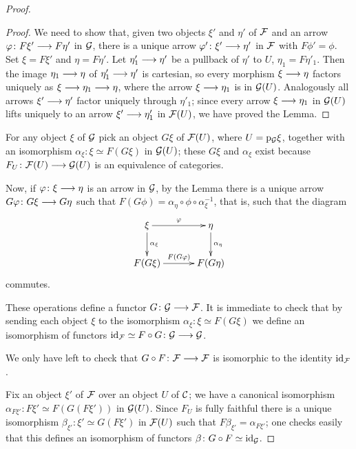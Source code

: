 \begin{3   FIBERED CATEGORIES}
\begin{3.5 Equivalences of fibered categories}
\begin{proof}
\begin{proof} We need to show that, given two objects $\xi'$ and $\eta'$ of $\mathcal{F}$ and an arrow $\phi \colon F \xi' \arr F \eta'$ in $\mathcal{G}$, there is a unique arrow $\phi' \colon \xi' \arr \eta'$ in $\mathcal{F}$ with $F \phi' = \phi$. Set $\xi = F \xi'$ and $\eta = F \eta'$. Let $\eta'_1 \arr \eta'$ be a pullback of $\eta'$ to $U$, $\eta_1 = F \eta'_1$. Then the image $\eta_1 \arr \eta$ of $\eta_1' \arr \eta'$ is cartesian, so every morphism $\xi \arr \eta$ factors uniquely as $\xi \arr \eta_1 \arr \eta$, where the arrow $\xi \arr \eta_1$ is in $\mathcal{G}(U)$. Analogously all arrows $\xi' \arr \eta'$ factor uniquely through $\eta'_1$; since every arrow $\xi \arr \eta_1$ in $\mathcal{G}(U)$ lifts uniquely to an arrow $\xi' \arr \eta'_1$ in $\mathcal{F}(U)$, we have proved the Lemma.
\end{proof}

For any object $\xi$ of $\mathcal{G}$ pick an object $G \xi$ of $\mathcal{F}(U)$, where $U = \mathrm{p}_{\mathcal{G}} \xi$, together with an isomorphism $\alpha_\xi \colon \xi \simeq F(G \xi)$ in $\mathcal{G}(U)$; these $G \xi$ and $\alpha_\xi$ exist because $F_U \colon \cF(U) \arr \cG(U)$ is an equivalence of categories. 

Now, if $\phi\colon \xi \arr \eta$ is an arrow in $\mathcal{G}$, by the Lemma there is a unique arrow $G \phi \colon G \xi \arr G \eta$ such that $F(G \phi) = \alpha_\eta\circ \phi \circ \alpha_\xi^{-1}$, that is, such that the diagram
   \[
   \xymatrix@C+8pt{{}\xi\ar[r]^{\phi}
    \ar[d]^{\alpha_\xi}& 
   {}\eta\ar[d]^{\alpha_\eta}\\
   F(G \xi)\ar[r]^{F(G \phi)}&F(G \eta)}
   \] commutes.

These operations define a functor $G \colon  \cG \arr \cF$. It is immediate to check that by sending each object $\xi$ to the isomorphism $\alpha_\xi \colon \xi \simeq F(G \xi)$ we define an isomorphism of functors $\id_{\mathcal F} \simeq F \circ G \colon \cG \arr \cG$. 

We only have left to check that $G \circ F \colon \cF \arr \cF$ is isomorphic to the identity $\mathrm{id}_{\mathcal F}$. 

Fix an object $\xi'$ of $\mathcal{F}$ over an object $U$ of $\mathcal{C}$; we have a canonical isomorphism $\alpha_{F \xi'} \colon F \xi' \simeq F(G(F \xi'))$ in $\mathcal{G}(U)$. Since $F_U$ is fully faithful there is a unique isomorphism $\beta_{\xi'} \colon \xi' \simeq G(F \xi')$ in $\mathcal{F}(U)$ such that $F \beta_{\xi'} = \alpha_{F \xi'}$; one checks easily that this defines an isomorphism of functors $\beta\colon G \circ F \simeq \mathrm{id}_{\mathcal G}$.
\end{proof}



\end{3.5 Equivalences of fibered categories}
\end{3   FIBERED CATEGORIES}
